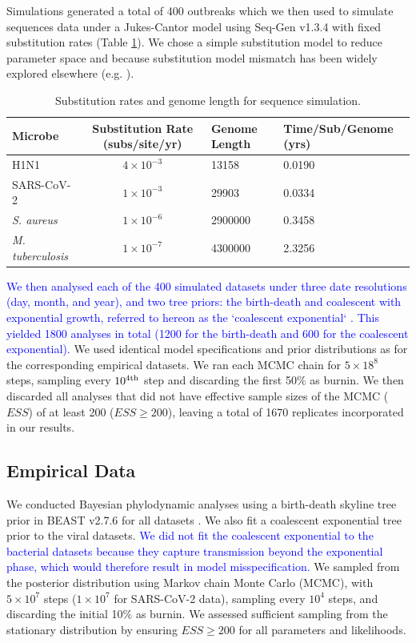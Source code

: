 \documentclass[12pt]{article}
\begin{document}
\begin{spacing}{2}
Simulations generated a total of 400 outbreaks which we then used to simulate sequences data under a Jukes-Cantor model using Seq-Gen v1.3.4 \citep{rambaut_seq-gen_1997} with fixed substitution rates (Table \ref{tab:seq_parms}). We chose a simple substitution model to reduce parameter space and because substitution model mismatch has been widely explored elsewhere (e.g. \citet{lemmon2004importance}).

\begin{table}[H]
    \centering
    \caption{Substitution rates and genome length for sequence simulation.}
    \begin{tabular}{lcll}
    \toprule
    Microbe                     &   Substitution Rate (subs/site/yr) & Genome Length & Time/Sub/Genome (yrs)  \\
    \midrule
    H1N1                        & $4\times10^{-3}$ & 13158 & 0.0190\\
    SARS-CoV-2                  & $1\times10^{-3}$ & 29903 & 0.0334\\
    \textit{S. aureus}    & $1\times10^{-6}$ & 2900000  & 0.3458\\
    \textit{M. tuberculosis}    &   $1\times10^{-7}$ & 4300000 & 2.3256\\
    \bottomrule
    \end{tabular}
    \label{tab:seq_parms}
\end{table}

\textcolor{blue}{We then analysed each of the 400 simulated datasets under three date resolutions (day, month, and year), and two tree priors: the birth-death \citep{stadler2012estimating} and coalescent with exponential growth, referred to hereon as the `coalescent exponential` \citep{kingman_1982_coalescent}. This yielded 1800 analyses in total (1200 for the birth-death and 600 for the coalescent exponential).} We used identical model specifications and prior distributions as for the corresponding empirical datasets. We ran each MCMC chain for $5\times18^{8}$ steps, sampling every $10^{4\textnormal{th}}$ step and discarding the first 50\% as burnin. We then discarded all analyses that did not have effective sample sizes of the MCMC ($ESS$) of at least 200 ($ESS\geq200$), leaving a total of 1670 replicates incorporated in our results.

\subsection*{Empirical Data}
We conducted Bayesian phylodynamic analyses using a birth-death skyline tree prior in BEAST v2.7.6 for all datasets \citep{bouckaert_beast_2019}. We also fit a coalescent exponential tree prior to the viral datasets. \textcolor{blue}{We did not fit the coalescent exponential to the bacterial datasets because they capture transmission beyond the exponential phase, which would therefore result in model misspecification.} We sampled from the posterior distribution using Markov chain Monte Carlo (MCMC), with $5\times10^{7}$ steps ($1\times10^{7}$ for SARS-CoV-2 data), sampling every $10^{4}$ steps, and discarding the initial 10\% as burnin. We assessed sufficient sampling from the stationary distribution by ensuring $ESS\geq200$ for all parameters and likelihoods.


\end{spacing}
\end{document}
